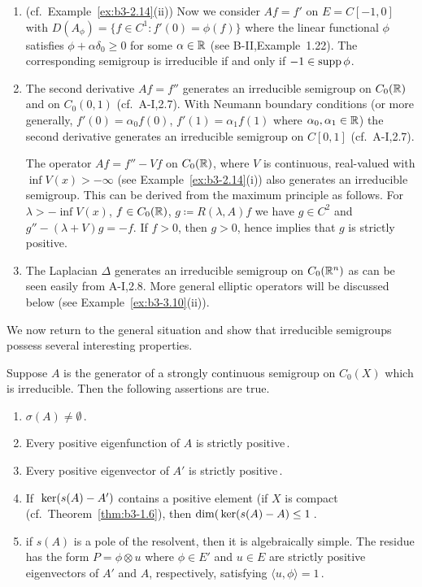 \begin{examples}
\begin{enumerate}[\upshape (i), wide, labelindent=.5em]
	\item 
	(cf.\ Example~\ref{ex:b3-2.14}(ii)) Now we consider $Af = f'$ on $E = C[-1,0]$ with $D(A_{\phi}) = \{f \in C^1 : f'(0) = \phi(f)\}$ where the linear functional $\phi$ satisfies $\phi + \alpha\delta_{0} \geq 0$ for some $\alpha \in \mathbb{R}$ (see B-II,Example~1.22).
	The corresponding semigroup is irreducible if and only if $-1 \in \mathop{}\!\mathrm{supp}\,\phi$.
	
	\item 
	The second derivative $Af = f''$ generates an irreducible semigroup on $C_{0}(\mathbb{R})$ and on $C_{0}(0,1)$ (cf.\ A-I,2.7).
	With Neumann boundary conditions (or more generally, $f'(0) = \alpha_{0}f(0)$, $f'(1) = \alpha_{1}f(1)$ where $\alpha_{0}, \alpha_{1} \in \mathbb{R}$) the second derivative generates an irreducible semigroup on $C[0,1]$ (cf.\ A-I,2.7).
	
	The operator $Af = f'' - Vf$ on $C_{0}(\mathbb{R})$, where $V$ is continuous, real-valued with $\inf V(x) > -\infty$ (see Example~\ref{ex:b3-2.14}(i)) also generates an irreducible semigroup.
	This can be derived from the maximum principle as follows. 
    For $\lambda > -\inf V(x)$, $f \in C_{0}(\mathbb{R})$, $g \coloneq R(\lambda,A)f$ we have $g \in C^2$ and $g'' - (\lambda + V)g = -f$.
	If $f > 0$, then $g > 0$, hence \citet[Chap.I, Theorem~3]{protterweinberger:1967} implies that $g$ is strictly positive.
	
	\item 
	The Laplacian $\Delta$ generates an irreducible semigroup on $C_{0}(\mathbb{R}^n)$ as can be seen easily from A-I,2.8.
	More general elliptic operators will be discussed below (see Example~\ref{ex:b3-3.10}(ii)).
\end{enumerate}
\end{examples}
We now return to the general situation and show that irreducible semigroups possess several interesting properties.
\begin{proposition}\label{prop:b3-3.5}
	Suppose $A$ is the generator of a strongly continuous semigroup on $C_{0}(X)$ which is irreducible.
	Then the following assertions are true.
	\begin{enumerate}[\upshape (i)]
		\item 
		$\sigma(A) \neq \emptyset$\,.
		
		\item 
		Every positive eigenfunction of $A$ is strictly positive\,.
		
		\item 
		Every positive eigenvector of $A'$ is strictly positive\,.
		
		\item 
		If\ $\mathop{}\mathrm{ker}(s(A) - A')$ contains a positive element (\eg if $X$ is compact (cf.\ Theorem~\ref{thm:b3-1.6}), then $\dim(\mathop{}\mathrm{ker}(s(A) - A) \leq 1$\,.
		
		\item 
		if $s(A)$ is a pole of the resolvent, then it is algebraically simple.
		The residue has the form $P = \phi \otimes u$ where $\phi \in E'$ and $u \in E$ are strictly positive eigenvectors of $A'$ and $A$, respectively, satisfying $\langle u,\phi\rangle = 1$\,.
	\end{enumerate}
\end{proposition}
